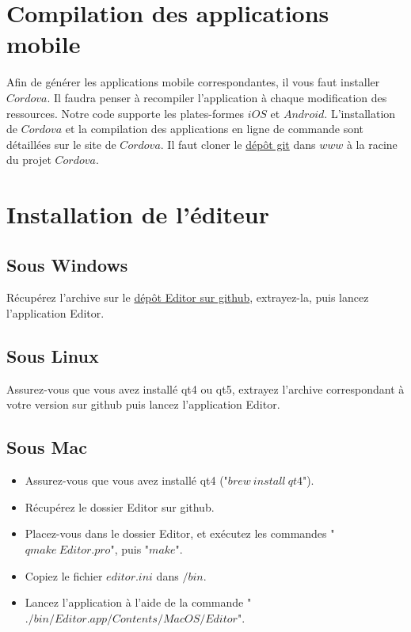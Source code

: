 \documentclass[11pt]{article}
\begin{document}
\section{Compilation des applications mobile}

Afin de générer les applications mobile correspondantes, il vous faut installer $Cordova$. Il faudra penser à recompiler l'application à chaque modification des ressources. Notre code supporte les plates-formes $iOS$ et $Android$. L'installation de $Cordova$ et la compilation des applications en ligne de commande sont détaillées sur le site de \href{http://cordova.apache.org/docs/en/3.5.0/guide_cli_index.md.html#The%20Command-Line%20Interface}{$Cordova$}.
	Il faut cloner le \href{https://github.com/ProjetCristallo/alchemist}{dépôt git} dans $www$ à la racine du projet $Cordova$. 

\section{Installation de l'éditeur}
\subsection{Sous Windows}
Récupérez l'archive sur le \href{https://github.com/ProjetCristallo/Editor/releases}{dépôt Editor sur github}, extrayez-la, puis lancez l'application Editor.
\subsection{Sous Linux}
Assurez-vous que vous avez installé qt4 ou qt5, extrayez l'archive correspondant à votre version sur github puis lancez l'application Editor.
\subsection{Sous Mac}
\begin{itemize}
\item Assurez-vous que vous avez installé qt4 ("$brew\ install\ qt4$").
\item Récupérez le dossier Editor sur github.
\item Placez-vous dans le dossier Editor, et exécutez les commandes "$qmake\ Editor.pro$", puis "$make$".
\item Copiez le fichier $editor.ini$ dans $/bin$.
\item Lancez l'application à l'aide de la commande "$./bin/Editor.app/Contents/MacOS/Editor$".
\end{itemize}
\end{document}
